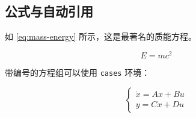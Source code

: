 \subsection{公式与自动引用}
\label{sec:math}

如 \autoref{eq:mass-energy} 所示，这是最著名的质能方程。

\begin{equation}
    E = mc^2
    \label{eq:mass-energy}
\end{equation}

带编号的方程组可以使用 \texttt{cases} 环境：

\begin{equation}
    \begin{cases}
        \dot{x} = Ax + Bu \\[2pt]
        y = Cx + Du
    \end{cases}
    \label{eq:state-space}
\end{equation}
